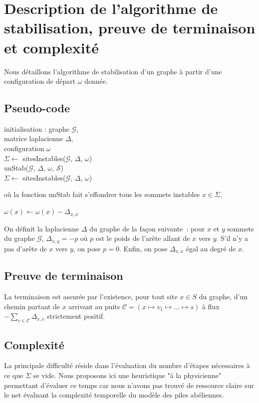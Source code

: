 \documentclass{article}
\begin{document}
\section{Description de l'algorithme de stabilisation, preuve de terminaison et complexité}
Nous détaillons l'algorithme de stabilisation d'un graphe à partir d'une configuration de départ $\omega$ donnée.
\subsection{Pseudo-code}
\begin{algorithm}[H]
	initialisation : graphe $\mathcal{G}$, \\
	matrice laplacienne $\Delta$,\\ configuration $\omega$\\
	$\Sigma \leftarrow$ sitesInstables($\mathcal{G}$, $\Delta$, $ \omega$)\\
	\Tq{$\Sigma \neq \varnothing$} {
		unStab($\mathcal{G}$, $\Delta$, $\omega$, $\mathcal{S}$)\\
		$\Sigma \leftarrow$ sitesInstables($\mathcal{G}$, $ \Delta$, $\omega$) 
	}
\end{algorithm}

où la fonction unStab fait s'effondrer tous les sommets instables $x\in \Sigma$,\newline 
\begin{algorithm}[H]
	 {
		$\omega(x) \leftarrow \omega(x)-\Delta_{x,x}$\\
	}
\end{algorithm}
On définit la laplacienne $\Delta$ du graphe de la façon suivante : pour $x$ et $y$ sommets du graphe $\mathcal{G}$, $\Delta_{x,y}= -p$ où $p$ est le poids de l'arête allant de $x$ vers $y$.  S'il n'y a pas d'arête de $x$ vers $y$, on pose $p=0$. Enfin, on pose $\Delta_{x,x}$ égal au degré de $x$.

\subsection{Preuve de terminaison}
La terminaison est assurée par l'existence, pour tout site $x\in S$ du graphe, d'un chemin partant de $x$ arrivant au puits $\mathcal{C}=(x\mapsto v_1\mapsto \ldots\mapsto s)$ à flux $-\sum_{v\in \mathcal{C}} \Delta_{x,v}$ strictement positif. 
\subsection{Complexité}
La principale difficulté réside dans l'évaluation du nombre d'étapes nécessaires à ce que $\Sigma$ se vide. Nous proposons ici une heuristique "à la physicienne" permettant d'évaluer ce temps car nous n'avons pas trouvé de ressource claire sur le net évaluant la complexité temporelle du modèle des piles abéliennes. 
\end{document}
